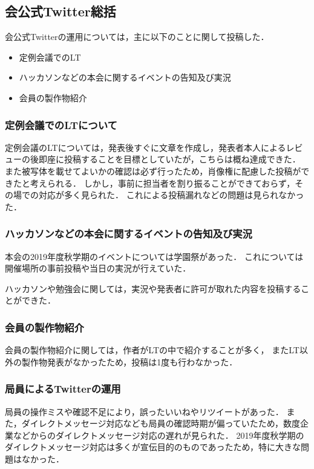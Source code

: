 \subsection*{会公式Twitter総括}


会公式Twitterの運用については，主に以下のことに関して投稿した．
\begin{itemize}
\item 定例会議でのLT
\item ハッカソンなどの本会に関するイベントの告知及び実況
\item 会員の製作物紹介
\end{itemize}

\subsubsection*{定例会議でのLTについて}
定例会議のLTについては，発表後すぐに文章を作成し，発表者本人によるレビューの後即座に投稿することを目標としていたが，こちらは概ね達成できた．
また被写体を載せてよいかの確認は必ず行ったため，肖像権に配慮した投稿ができたと考えられる．
しかし，事前に担当者を割り振ることができておらず，その場での対応が多く見られた．
これによる投稿漏れなどの問題は見られなかった．

\subsubsection*{ハッカソンなどの本会に関するイベントの告知及び実況}
本会の2019年度秋学期のイベントについては学園祭があった．
これについては開催場所の事前投稿や当日の実況が行えていた．

ハッカソンや勉強会に関しては，実況や発表者に許可が取れた内容を投稿することができた．

\subsubsection*{会員の製作物紹介}
会員の製作物紹介に関しては，作者がLTの中で紹介することが多く，
またLT以外の製作物発表がなかったため，投稿は1度も行わなかった．

\subsubsection*{局員によるTwitterの運用}
局員の操作ミスや確認不足により，誤ったいいねやリツイートがあった．
また，ダイレクトメッセージ対応なども局員の確認時期が偏っていたため，数度企業などからのダイレクトメッセージ対応の遅れが見られた．
2019年度秋学期のダイレクトメッセージ対応は多くが宣伝目的のものであったため，特に大きな問題はなかった．
